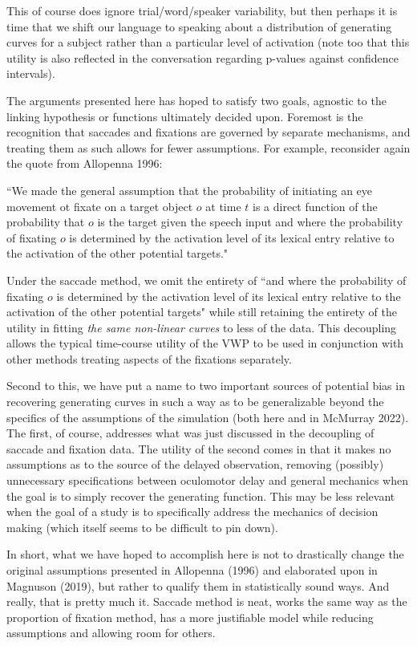 \documentclass{article}
\begin{document}
This of course does ignore trial/word/speaker variability, but then perhaps it is time that we shift our language to speaking about a distribution of generating curves for a subject rather than a particular level of activation (note too that this utility is also reflected in the conversation regarding p-values against confidence intervals). 

The arguments presented here has hoped to satisfy two goals, agnostic to the linking hypothesis or functions ultimately decided upon. Foremost is the recognition that saccades and fixations are governed by separate mechanisms, and treating them as such allows for fewer assumptions. For example, reconsider again the quote from Allopenna 1996:

 ``We made the general assumption that the probability of initiating an eye movement ot fixate on a target object $o$ at time $t$ is a direct function of the probability that $o$ is the target given the speech input and where the probability of fixating $o$ is determined by the activation level of its lexical entry relative to the activation of the other potential targets."
 
Under the saccade method, we omit the entirety of ``and where the probability of fixating $o$ is determined by the activation level of its lexical entry relative to the activation of the other potential targets" while still retaining the entirety of the utility in fitting \textit{the same non-linear curves} to less of the data. This decoupling allows the typical time-course utility of the VWP to be used in conjunction with other  methods treating aspects of the fixations separately.

Second to this, we have put a name to two important sources of potential bias in recovering generating curves in such a way as to be generalizable beyond the specifics of the assumptions of the simulation (both here and in McMurray 2022). The first, of course, addresses what was just discussed in the decoupling of saccade and fixation data. The utility of the second comes in that it makes no assumptions as to the source of the delayed observation, removing (possibly) unnecessary specifications between oculomotor delay and general mechanics when the goal is to simply recover the generating function. This may be less relevant when the goal of a study is to specifically address the mechanics of decision making (which itself seems to be difficult to pin down).

In short, what we have hoped to accomplish here is not to drastically change the original assumptions presented in Allopenna (1996) and elaborated upon in Magnuson (2019), but rather to qualify them in statistically sound ways. And really, that is pretty much it. Saccade method is neat, works the same way as the proportion of fixation method, has a more justifiable model while reducing assumptions and allowing room for others.
\end{document}

